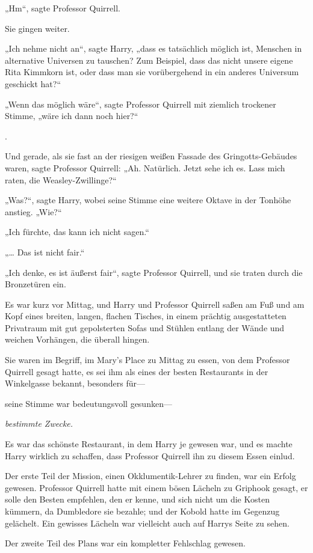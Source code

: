 {„Hm“, sagte Professor Quirrell.

Sie gingen weiter.

„Ich nehme nicht an“, sagte Harry, „dass es tatsächlich möglich ist, Menschen in alternative Universen zu tauschen? Zum Beispiel, dass das nicht unsere eigene Rita Kimmkorn ist, oder dass man sie vorübergehend in ein anderes Universum geschickt hat?“

„Wenn das möglich wäre“, sagte Professor Quirrell mit ziemlich trockener Stimme, „wäre ich dann noch hier?“

.

Und gerade, als sie fast an der riesigen weißen Fassade des Gringotts-Gebäudes waren, sagte Professor Quirrell: „Ah. Natürlich. Jetzt sehe ich es. Lass mich raten, die Weasley-Zwillinge?“

„Was?“, sagte Harry, wobei seine Stimme eine weitere Oktave in der Tonhöhe anstieg. „Wie?“

„Ich fürchte, das kann ich nicht sagen.“

„… Das ist nicht fair.“

„Ich denke, es ist äußerst fair“, sagte Professor Quirrell, und sie traten durch die Bronzetüren ein.

Es war kurz vor Mittag, und Harry und Professor Quirrell saßen am Fuß und am Kopf eines breiten, langen, flachen Tisches, in einem prächtig ausgestatteten Privatraum mit gut gepolsterten Sofas und Stühlen entlang der Wände und weichen Vorhängen, die überall hingen.

Sie waren im Begriff, im Mary's Place zu Mittag zu essen, von dem Professor Quirrell gesagt hatte, es sei ihm als eines der besten Restaurants in der Winkelgasse bekannt, besonders für—

seine Stimme war bedeutungsvoll gesunken—

\emph{bestimmte Zwecke.}

Es war das schönste Restaurant, in dem Harry je gewesen war, und es machte Harry wirklich zu schaffen, dass Professor Quirrell ihn zu diesem Essen einlud.

Der erste Teil der Mission, einen Okklumentik-Lehrer zu finden, war ein Erfolg gewesen. Professor Quirrell hatte mit einem bösen Lächeln zu Griphook gesagt, er solle den Besten empfehlen, den er kenne, und sich nicht um die Kosten kümmern, da Dumbledore sie bezahle; und der Kobold hatte im Gegenzug gelächelt. Ein gewisses Lächeln war vielleicht auch auf Harrys Seite zu sehen.

Der zweite Teil des Plans war ein kompletter Fehlschlag gewesen.

}
